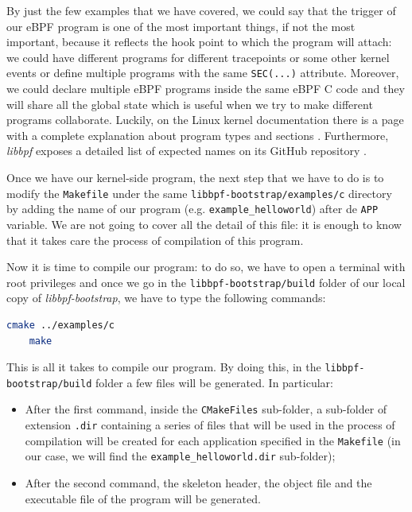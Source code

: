 By just the few examples that we have covered, we could say that the trigger of our eBPF program is one of the most important things, if not the most important, because it reflects the hook point to which the program will attach: we could have different programs for different tracepoints or some other kernel events or define multiple programs with the same \verb|SEC(...)| attribute.
Moreover, we could declare multiple eBPF programs inside the same eBPF C code and they will share all the global state which is useful when we try to make different programs collaborate.
Luckily, on the Linux kernel documentation there is a page with a complete explanation about program types and sections \cite{SecLinuxKernelDoc}.
Furthermore, \textit{libbpf} exposes a detailed list of expected names on its GitHub repository \cite{SecListlibbpf}.

Once we have our kernel-side program, the next step that we have to do is to modify the \verb|Makefile| under the same \verb|libbpf-bootstrap/examples/c| directory by adding the name of our program (e.g. \verb|example_helloworld|) after de \verb|APP| variable.
We are not going to cover all the detail of this file: it is enough to know that it takes care the process of compilation of this program.

Now it is time to compile our program: to do so, we have to open a terminal with root privileges and once we go in the \verb|libbpf-bootstrap/build| folder of our local copy of \textit{libbpf-bootstrap}, we have to type the following commands:

\begin{lstlisting}[language=bash, caption={libbpf-bootstrap program's compilation commands}]
	cmake ../examples/c
	make
\end{lstlisting}

This is all it takes to compile our program.
By doing this, in the \verb|libbpf-bootstrap/build| folder a few files will be generated.
In particular:

\begin{itemize}
	\item After the first command, inside the \verb|CMakeFiles| sub-folder, a 
		sub-folder of extension \verb|.dir| containing a series of files that will be used in the process of compilation will be created for each application specified in the \verb|Makefile| (in our case, we will find the \verb|example_helloworld.dir| sub-folder);
	\item After the second command, the skeleton header, the object file and the
		executable file of the program will be generated.
\end{itemize}


